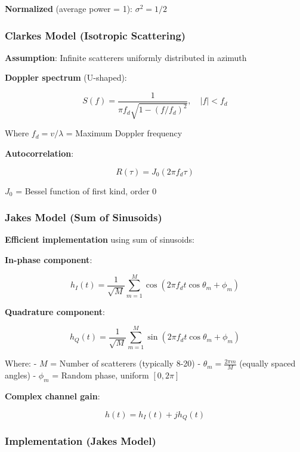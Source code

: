 \textbf{Normalized} (average power = 1): \(\sigma^2 = 1/2\)


\subsubsection{Clarke\textquotesingle s Model (Isotropic
Scattering)}\label{clarkes-model-isotropic-scattering}

\textbf{Assumption}: Infinite scatterers uniformly distributed in
azimuth

\textbf{Doppler spectrum} (U-shaped):

\[
S(f) = \frac{1}{\pi f_d \sqrt{1 - (f/f_d)^2}}, \quad |f| < f_d
\]

Where \(f_d = v/\lambda\) = Maximum Doppler frequency

\textbf{Autocorrelation}:

\[
R(\tau) = J_0(2\pi f_d \tau)
\]

\(J_0\) = Bessel function of first kind, order 0


\subsubsection{Jakes\textquotesingle{} Model (Sum of
Sinusoids)}\label{jakes-model-sum-of-sinusoids}

\textbf{Efficient implementation} using sum of sinusoids:

\textbf{In-phase component}:

\[
h_I(t) = \frac{1}{\sqrt{M}} \sum_{m=1}^{M} \cos(2\pi f_d t \cos\theta_m + \phi_m)
\]

\textbf{Quadrature component}:

\[
h_Q(t) = \frac{1}{\sqrt{M}} \sum_{m=1}^{M} \sin(2\pi f_d t \cos\theta_m + \phi_m)
\]

Where: - \(M\) = Number of scatterers (typically 8-20) -
\(\theta_m = \frac{2\pi m}{M}\) (equally spaced angles) - \(\phi_m\) =
Random phase, uniform $[0, 2\pi]$

\textbf{Complex channel gain}:

\[
h(t) = h_I(t) + j h_Q(t)
\]


\subsubsection{Implementation (Jakes\textquotesingle{}
Model)}\label{implementation-jakes-model}

